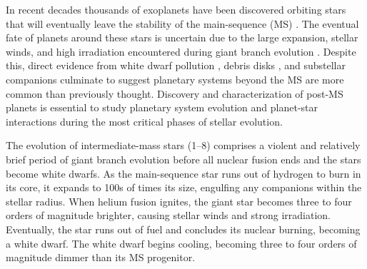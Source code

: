 \documentclass[twocolumn,linenumbers]{aastex631}
\begin{document}
In recent decades thousands of exoplanets have been discovered orbiting stars that will eventually leave the stability of the main-sequence (MS) \citep{akesonNASAExoplanetArchive2013}. The eventual fate of planets around these stars is uncertain due to the large expansion, stellar winds, and high irradiation encountered during giant branch evolution \citep{verasPostmainsequencePlanetarySystem2016}. Despite this, direct evidence from white dwarf pollution \citep{juraExternallyPollutedWhite2007,xuSpitzerObservationsWhite2012}, debris disks \citep{deruyterKeplerianDiscsPostAGB2006,zuckermanAncientPlanetarySystems2010,koesterFrequencyPlanetaryDebris2014}, and substellar companions \citep[e.g.,][]{luhmanDiscoveryCandidateCoolest2011,vanderburgGiantPlanetCandidate2020,blackmanJovianAnalogueOrbiting2021} culminate to suggest planetary systems beyond the MS are more common than previously thought. Discovery and characterization of post-MS planets is essential to study planetary system evolution and planet-star interactions during the most critical phases of stellar evolution.

The evolution of intermediate-mass stars (\qtyrange{1}{8}{\solarmass}) comprises a violent and relatively brief period of giant branch evolution before all nuclear fusion ends and the stars become white dwarfs. As the main-sequence star runs out of hydrogen to burn in its core, it expands to 100s of times its size, engulfing any companions within the stellar radius. When helium fusion ignites, the giant star becomes three to four orders of magnitude brighter, causing stellar winds and strong irradiation. Eventually, the star runs out of fuel and concludes its nuclear burning, becoming a white dwarf. The white dwarf begins cooling, becoming three to four orders of magnitude dimmer than its MS progenitor.
\end{document}
